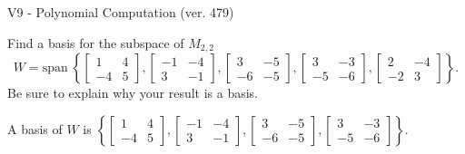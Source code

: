 \begin{exercise}
  \begin{exerciseTitle}V9 - Polynomial Computation (ver. 479)\end{exerciseTitle}
  \begin{exerciseStatement}
    Find a basis for the subspace of \(M_{2,2}\) 
\[W=\mathrm{span}\ \left\{\left[\begin{array}{cc}
1 & 4 \\
-4 & 5
\end{array}\right] , \left[\begin{array}{cc}
-1 & -4 \\
3 & -1
\end{array}\right] , \left[\begin{array}{cc}
3 & -5 \\
-6 & -5
\end{array}\right] , \left[\begin{array}{cc}
3 & -3 \\
-5 & -6
\end{array}\right] , \left[\begin{array}{cc}
2 & -4 \\
-2 & 3
\end{array}\right]\right\}.\]
 Be sure to explain why your result is a basis.


  \end{exerciseStatement}
  \begin{exerciseAnswer}
   A basis of \(W\) is  \(\left\{\left[\begin{array}{cc}
1 & 4 \\
-4 & 5
\end{array}\right] , \left[\begin{array}{cc}
-1 & -4 \\
3 & -1
\end{array}\right] , \left[\begin{array}{cc}
3 & -5 \\
-6 & -5
\end{array}\right] , \left[\begin{array}{cc}
3 & -3 \\
-5 & -6
\end{array}\right]\right\}\).
  


  \end{exerciseAnswer}
\end{exercise}